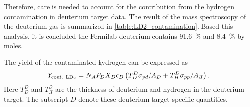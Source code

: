 \documentclass[../main.tex]{subfiles}
\begin{document}
Therefore, care is needed to account for the contribution from the hydrogen contamination in deuterium
target data. The result of the mass spectroscopy of the deuterium gas \cite{don-4993} is
summarized in \cref{table:LD2_contamination}. Based this analysis, it is concluded the Fermilab
deuterium contains \SI{91.6}{\percent}  and \SI{8.4}{\percent}  by moles. 

The yield of the contaminated hydrogen can be expressed as
\begin{equation}
	Y_{\mathrm{cont.~\ce{LD_2}}} = N_A P_D X_D \epsilon_D \left( T_D^D \sigma_{pd}/A_D + T^D_H \sigma_{pp}/A_H   \right).
\end{equation}
Here $T_D^D$ and $T^D_H$ are the thickness of deuterium and hydrogen in the deuterium target.
The subscript $D$ denote these deuterium target specific quantities.
\end{document}
